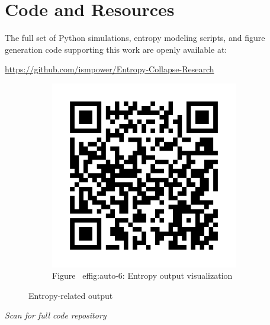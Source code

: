 \documentclass[12pt]{article}
\begin{document}
\section*{Code and Resources}

The full set of Python simulations, entropy modeling scripts, and figure generation code supporting this work are openly available at:
\begin{center}
\url{https://github.com/ismpower/Entropy-Collapse-Research}
\begin{figure}[H]
\centering
\begin{figure}[H]
\centering
\includegraphics[width=0.9\textwidth]{qr_code.png}
\caption{Figure~
ef{fig:auto-6}: Entropy output visualization}
\label{fig:auto-6}
\end{figure}
\caption{Entropy-related output}
\label{fig:Figures_qr_code_png}
\end{figure}

\textit{Scan for full code repository}\

\end{center}
\end{document}

